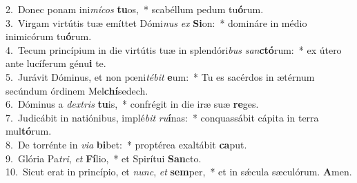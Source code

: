 {2.~}Donec ponam ini\textit{mí}\textit{cos} \textbf{tu}os,~* scabéllum pedum tu\textbf{ó}rum.\\
{3.~}Virgam virtútis tuæ emíttet Dómi\textit{nus} \textit{ex} \textbf{Si}on:~* domináre in médio inimicórum tu\textbf{ó}rum.\\
{4.~}Tecum princípium in die virtútis tuæ in splendóri\textit{bus} \textit{san}\textbf{ctó}rum:~* ex útero ante lucíferum génu\textbf{i} te.\\
{5.~}Jurávit Dóminus, et non pœni\textit{té}\textit{bit} \textbf{e}um:~* Tu es sacérdos in ætérnum secúndum órdinem Mel\textbf{chí}sedech.\\
{6.~}Dóminus a \textit{dex}\textit{tris} \textbf{tu}is,~* confrégit in die iræ suæ \textbf{re}ges.\\
{7.~}Judicábit in natiónibus, implé\textit{bit} \textit{ru}\textbf{í}nas:~* conquassábit cápita in terra mul\textbf{tó}rum.\\
{8.~}De torrénte in \textit{vi}\textit{a} \textbf{bi}bet:~* proptérea exaltábit \textbf{ca}put.\\
{9.~}Glória Pa\textit{tri}, \textit{et} \textbf{Fí}lio,~* et Spirítui \textbf{San}cto.\\
{10.~}Sicut erat in princípio, et \textit{nunc}, \textit{et} \textbf{sem}per,~* et in sǽcula sæculórum. \textbf{A}men.\\
